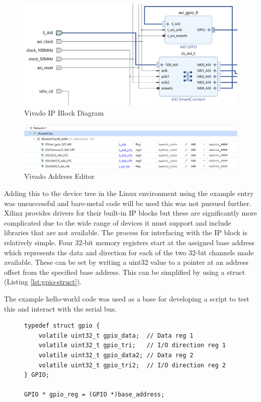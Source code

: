 \begin{figure}[H]
	\centering
	\includegraphics[scale=0.4]{GPIO_IP.png}
	\caption{Vivado IP Block Diagram}
	\label{fig:gpio_ip}
\end{figure}

\begin{figure}[H]
	\centering
	\includegraphics[scale=0.6]{address_editor.png}
	\caption{Vivado Address Editor}
	\label{fig:address_editor}
\end{figure}

Adding this to the device tree in the Linux environment using the example entry was unsuccessful and bare-metal code will be used this was not pursued further. Xilinx provides drivers \cite{xilinx_gpio_driver} for their built-in IP blocks but these are significantly more complicated due to the wide range of devices it must support and include libraries that are not available. The process for interfacing with the IP block is relatively simple. Four 32-bit memory registers start at the assigned base address which represents the data and direction for each of the two 32-bit channels made available. These can be set by writing a uint32 value to a pointer at an address offset from the specified base address. This can be simplified by using a struct (Listing \ref{lst:gpio-struct}).

The example hello-world code was used as a base for developing a script to test this and interact with the serial bus.

\begin{figure}[h]
\begin{lstlisting}[style=CStyle, caption={Definition of a structure to access virtual memory addresses.}, label={lst:gpio-struct}]
typedef struct gpio {
	volatile uint32_t gpio_data;  // Data reg 1
	volatile uint32_t gpio_tri;   // I/O direction reg 1
	volatile uint32_t gpio_data2; // Data reg 2
	volatile uint32_t gpio_tri2;  // I/O direction reg 2
} GPIO;

GPIO * gpio_reg = (GPIO *)base_address;
\end{lstlisting}
\end{figure}

